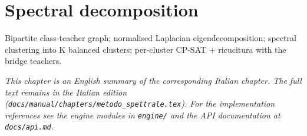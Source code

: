 \chapter{Spectral decomposition}
\label{ch:metodo_spettrale_en}

Bipartite class-teacher graph; normalised Laplacian eigendecomposition; spectral clustering into K balanced clusters; per-cluster CP-SAT + ricucitura with the bridge teachers.

\medskip
\noindent
\textit{This chapter is an English summary of the corresponding Italian chapter. The full text remains in the Italian edition (\texttt{docs/manual/chapters/metodo\_spettrale.tex}). For the implementation references see the engine modules in \texttt{engine/} and the API documentation at \texttt{docs/api.md}.}
